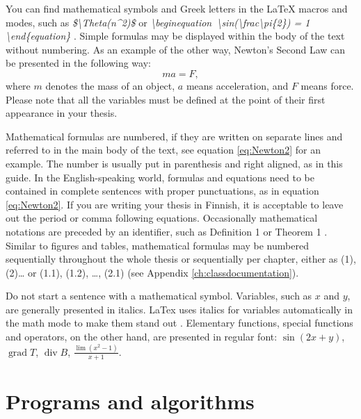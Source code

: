 \documentclass[twoside,draftfooter]{tutthesis} %
\begin{document}
You can find mathematical symbols and Greek letters in the LaTeX macros and modes, such as
\emph{\$\textbackslash Theta(n\textasciicircum2)\$}
or
\emph{\textbackslash begin\textbraceleft equation\textbraceright\ \textbackslash sin(\textbackslash frac\textbraceleft \textbackslash pi\textbraceright\{2\}) = 1 \textbackslash end\{equation\}}
.
Simple formulas may be displayed within the body of the text without numbering.
As an example of the other way, Newton's Second Law can be presented in the following way:
\begin{equation} %
\label{eq:Newton2} ma = F,
\end{equation} %
where $m$ denotes the mass of an object, $a$ means acceleration, and $F$ means force.
Please note that all the variables must be defined at the point of their first appearance in your thesis.


Mathematical formulas are numbered, if they are written on separate lines and referred to in the main body of the text, see equation \eqref{eq:Newton2} for an example.
The number is usually put in parenthesis and right aligned, as in this guide.
In the English-speaking world, formulas and equations need to be contained in complete sentences with proper punctuations, as in equation \eqref{eq:Newton2}.
If you are writing your thesis in Finnish, it is acceptable to leave out the period or comma following equations.
Occasionally mathematical notations are preceded by an identifier, such as Definition 1 or Theorem 1 \citep{Ruohonen2009}.
Similar to figures and tables, mathematical formulas may be numbered sequentially throughout the whole thesis or sequentially per chapter, either as (1), (2)… or (1.1), (1.2), \ldots, (2.1) (see Appendix \ref{ch:classdocumentation}).

Do not start a sentence with a mathematical symbol.
Variables, such as $x$ and $y$, are generally presented in italics.
LaTex uses italics for variables automatically in the math mode to make them stand out \citep{Oetiker2011}.
Elementary functions, special functions and operators, on the other hand, are presented in regular font: $\sin (2x+y)$, $\operatorname{grad} T$, $\operatorname{div} B$, $\frac{\lim (x^2 - 1)}{x + 1}$.


\section{Programs and algorithms}
\end{document}
